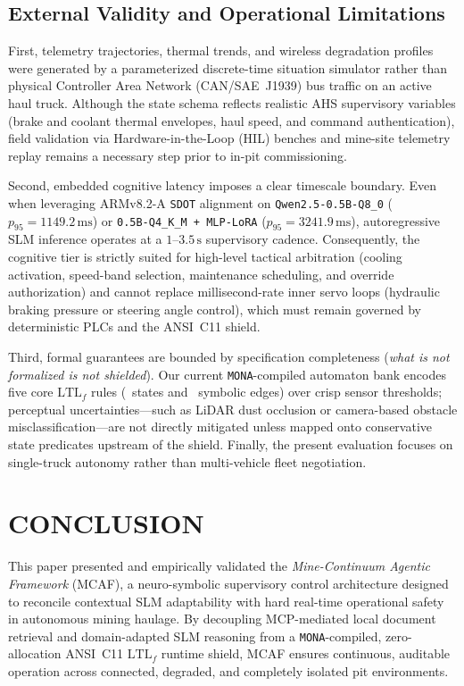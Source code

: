 \documentclass{ieeeaccess}
\begin{document}
\subsection{External Validity and Operational Limitations}
First, telemetry trajectories, thermal trends, and wireless degradation profiles were generated by a parameterized discrete-time situation simulator rather than physical Controller Area Network (CAN/SAE~J1939) bus traffic on an active haul truck. Although the state schema reflects realistic AHS supervisory variables (brake and coolant thermal envelopes, haul speed, and command authentication), field validation via Hardware-in-the-Loop (HIL) benches and mine-site telemetry replay remains a necessary step prior to in-pit commissioning.

Second, embedded cognitive latency imposes a clear timescale boundary. Even when leveraging ARMv8.2-A \texttt{SDOT} alignment on \texttt{Qwen2.5-0.5B-Q8\_0} ($p_{95} = 1149.2\,\text{ms}$) or \texttt{0.5B-Q4\_K\_M + MLP-LoRA} ($p_{95} = 3241.9\,\text{ms}$), autoregressive SLM inference operates at a $1$--$3.5\,\text{s}$ supervisory cadence. Consequently, the cognitive tier is strictly suited for high-level tactical arbitration (cooling activation, speed-band selection, maintenance scheduling, and override authorization) and cannot replace millisecond-rate inner servo loops (hydraulic braking pressure or steering angle control), which must remain governed by deterministic PLCs and the {\CShieldRTStressedMaxUs} ANSI~C11 shield.

Third, formal guarantees are bounded by specification completeness (\emph{what is not formalized is not shielded}). Our current \texttt{MONA}-compiled automaton bank encodes five core $\mathrm{LTL}_f$ rules (\ShieldStatesTotal~states and \ShieldEdgesTotal~symbolic edges) over crisp sensor thresholds; perceptual uncertainties—such as LiDAR dust occlusion or camera-based obstacle misclassification—are not directly mitigated unless mapped onto conservative state predicates upstream of the shield. Finally, the present evaluation focuses on single-truck autonomy rather than multi-vehicle fleet negotiation.

\section{CONCLUSION}
\label{sec:conclusion}
This paper presented and empirically validated the \emph{Mine-Continuum Agentic Framework} (MCAF), a neuro-symbolic supervisory control architecture designed to reconcile contextual SLM adaptability with hard real-time operational safety in autonomous mining haulage. By decoupling MCP-mediated local document retrieval and domain-adapted SLM reasoning from a \texttt{MONA}-compiled, zero-allocation ANSI~C11 $\mathrm{LTL}_f$ runtime shield, MCAF ensures continuous, auditable operation across connected, degraded, and completely isolated pit environments.
\end{document}
